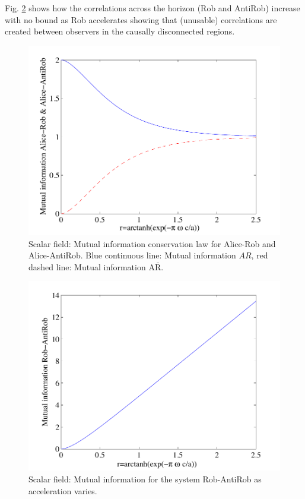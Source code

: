 Fig. \ref{mutuRARbos4m} shows how the correlations across the horizon (Rob and AntiRob) increase with no bound as Rob accelerates showing that (unusable) correlations are created between observers in the causally disconnected regions. 
\begin{figure}[h]
\begin{center}
\includegraphics[width=.85\textwidth]{mutuARAARbos2}
\end{center}
\caption{ Scalar field: Mutual information conservation law for Alice-Rob and Alice-AntiRob. Blue continuous line: Mutual information $AR$, red dashed line: Mutual information $\text{A}{\bar{\text{R}}}$.}
\label{mututradeoffbos}
\end{figure}
\begin{figure}[h]
\begin{center}
\includegraphics[width=.85\textwidth]{mutualRARbos}
\end{center}
\caption{Scalar field: Mutual information for the system Rob-AntiRob as acceleration varies.}
\label{mutuRARbos4m}
\end{figure}

